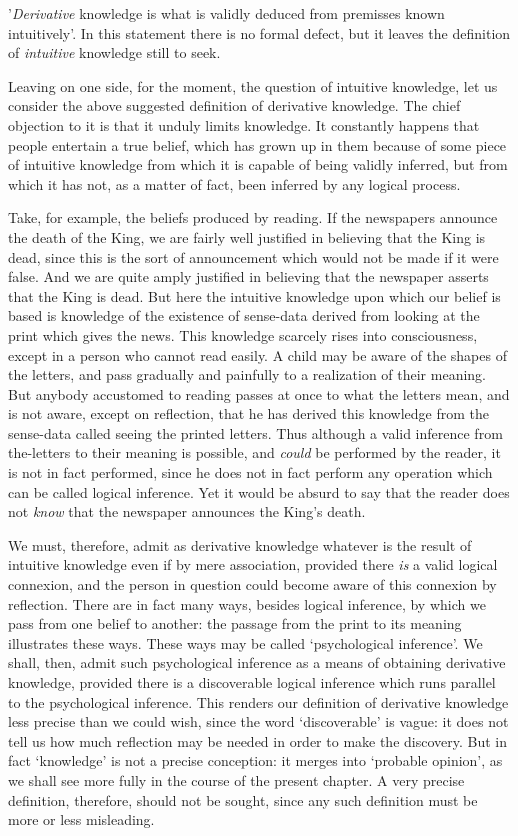 \documentclass[oneside,letterpaper,12pt]{book}
\begin{document}
'\emph{Derivative} knowledge is what is validly deduced
from premisses known intuitively'. In this statement
there is no formal defect, but it leaves the definition of
\emph{intuitive} knowledge still to seek.

Leaving on one side, for the moment, the question of intuitive
knowledge, let us consider the above suggested definition of derivative
knowledge. The chief objection to it is that it unduly limits knowledge.
It constantly happens that people entertain a true belief, which has
grown up in them because of some piece of intuitive knowledge from which
it is capable of being validly inferred, but from which it has not, as a
matter of fact, been inferred by any logical process.

Take, for example, the beliefs produced by reading. If the newspapers
announce the death of the King, we are fairly well justified in
believing that the King is dead, since this is the sort of announcement
which would not be made if it were false. And we are quite amply
justified in believing that the newspaper asserts that the King is dead.
But here the intuitive knowledge upon which our belief is based is
knowledge of the existence of sense-data derived from looking at the
print which gives the news. This knowledge scarcely rises into
consciousness, except in a person who cannot read easily. A child may be
aware of the shapes of the letters, and pass gradually and painfully to
a realization of their meaning. But anybody accustomed to reading passes
at once to what the letters mean, and is not aware, except on
reflection, that he has derived this knowledge from the sense-data
called seeing the printed letters. \label{reading} Thus although a valid inference from
the-letters to their meaning is possible, and \emph{could} be performed
by the reader, it is not in fact performed, since he does not in fact
perform any operation which can be called logical inference. Yet it
would be absurd to say that the reader does not \emph{know} that the
newspaper announces the King's death.

We must, therefore, admit as derivative knowledge whatever is the result
of intuitive knowledge even if by mere association, provided there
\emph{is} a valid logical connexion, and the person in question could
become aware of this connexion by reflection. There are in fact many
ways, besides logical inference, by which we pass from one belief to
another: the passage from the print to its meaning illustrates these
ways. These ways may be called `psychological
inference'. \label{psycho} We shall, then, admit such psychological
inference as a means of obtaining derivative knowledge, provided there
is a discoverable logical inference which runs parallel to the
psychological inference. This renders our definition of derivative
knowledge less precise than we could wish, since the word
`discoverable' is vague: it does not
tell us how much reflection may be needed in order to make the
discovery. But in fact `knowledge' is
not a precise conception: it merges into `probable
opinion', as we shall see more fully in the course of the
present chapter. A very precise definition, therefore, should not be
sought, since any such definition must be more or less misleading.
\end{document}
